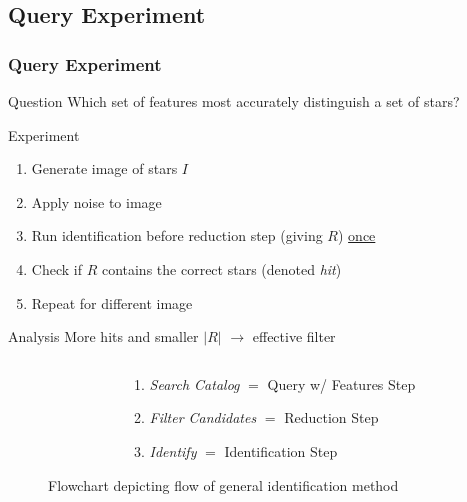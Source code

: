 \documentclass[11pt]{beamer}
\begin{document}
    \subsection{Query Experiment}\label{subsec:queryExperiment}
    \begin{frame}
        \frametitle{Query Experiment}
        \begin{block}{Question}
            Which set of features most accurately distinguish a set of stars?
        \end{block}
        \begin{block}{Experiment}
            \begin{enumerate}
                \item Generate image of stars $I$
                \item Apply noise to image
                \item Run identification before reduction step (giving $R$) \underline{once}
                \item Check if $R$ contains the correct stars (denoted \textit{hit})
                \item Repeat for different image
            \end{enumerate}
        \end{block}
        \begin{block}{Analysis}
            More hits and smaller $\lvert R \rvert$ $\rightarrow$ effective filter
        \end{block}
    \end{frame}

    \begin{frame}
        \begin{figure}
            \begin{columns}
                \begin{column}{0.4\linewidth}
                    \centering{\scalebox{.53}{}}
                \end{column}
                \begin{column}{0.6\linewidth}
                    \caption{Flowchart depicting flow of general identification method} \bigskip
                    \begin{enumerate}
                        \item \textit{Search Catalog} $=$ Query w/ Features Step \medskip
                        \item \textit{Filter Candidates} $=$ Reduction Step \medskip
                        \item \textit{Identify} $=$ Identification Step \medskip
                    \end{enumerate}
                \end{column}
            \end{columns}
        \end{figure}
    \end{frame}
\end{document}
